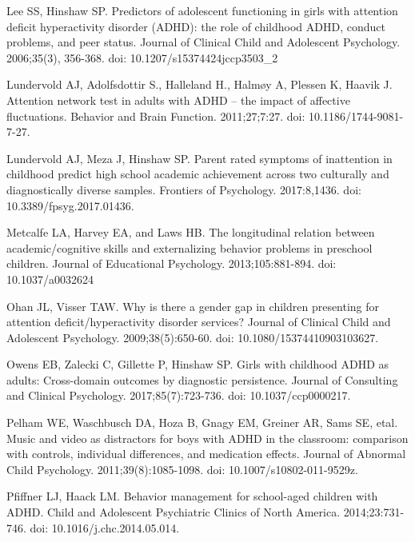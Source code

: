 \documentclass[10pt,letterpaper]{article}
\begin{document}
{{\begin{thebibliography}{10}
Lee SS, Hinshaw SP.
\newblock Predictors of adolescent functioning in girls with attention deficit
  hyperactivity disorder ({ADHD}): the role of childhood {ADHD}, conduct
  problems, and peer status.
\newblock Journal of Clinical Child and Adolescent Psychology. 2006;35(3), 356-368. doi: 10.1207/s15374424jccp3503\_2

Lundervold AJ, Adolfsdottir S., Halleland H., Halm\o{}y A, 
  Plessen K, Haavik J.
\newblock Attention network test in adults with ADHD -- the impact of affective
  fluctuations.
\newblock Behavior and Brain Function. 2011;27;7:27.  doi: 10.1186/1744-9081-7-27.

Lundervold  AJ, Meza J, Hinshaw SP.
\newblock Parent rated symptoms of inattention in childhood predict high school academic achievement across two culturally and diagnostically diverse samples.
\newblock Frontiers of Psychology. 2017:8,1436. doi: 10.3389/fpsyg.2017.01436.

Metcalfe LA, Harvey EA, and Laws HB.
\newblock The longitudinal relation between academic/cognitive skills and
  externalizing behavior problems in preschool children.
\newblock Journal of Educational Psychology. 2013;105:881-894. doi: 10.1037/a0032624

Ohan JL, Visser TAW.
\newblock Why is there a gender gap in children presenting for attention
  deficit/hyperactivity disorder services?
\newblock Journal of Clinical Child and Adolescent Psychology. 2009;38(5):650-60. doi: 10.1080/15374410903103627.
 

Owens EB, Zalecki C, Gillette P, Hinshaw SP.
\newblock Girls with childhood ADHD as adults: Cross-domain outcomes by
  diagnostic persistence.
\newblock Journal of Consulting and Clinical Psychology. 2017;85(7):723-736. doi: 10.1037/ccp0000217.

Pelham WE, Waschbusch DA, Hoza B, Gnagy EM,
  Greiner AR, Sams SE, etal. 
  \newblock Music and video as distractors for boys with {ADHD} in the classroom:
  comparison with controls, individual differences, and medication effects.
\newblock Journal of Abnormal Child Psychology. 2011;39(8):1085-1098. doi: 10.1007/s10802-011-9529\-z.

Pfiffner LJ, Haack LM.
\newblock Behavior management for school-aged children with {ADHD}.
\newblock Child and Adolescent Psychiatric Clinics of North America. 2014;23:731-746. doi: 10.1016/j.chc.2014.05.014.


\end{thebibliography}}}
\end{document}
